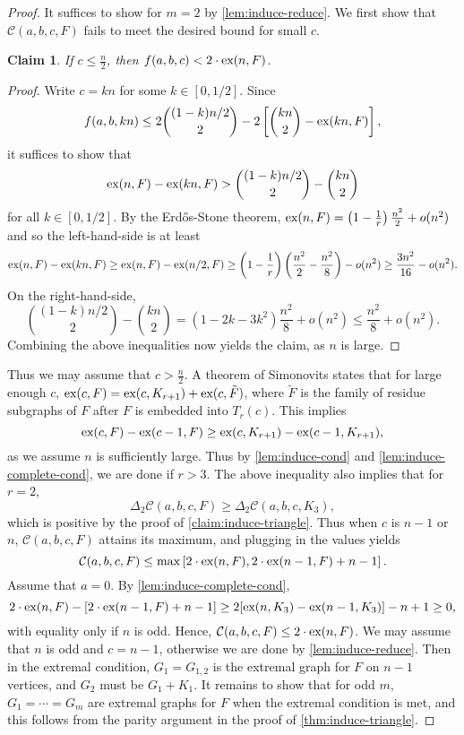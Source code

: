 \documentclass[12pt]{report}
\newtheorem{claim}{Claim}[theorem]
\newcommand*{\ex}{\textnormal{ex}}
\newcommand*{\con}{\mathcal{C}}
\begin{document}
\begin{proof}
  It suffices to show for $m = 2$ by \cref{lem:induce-reduce}. We first show that $\con(a, b, c, F)$ fails to meet the desired bound for small $c$.
  \begin{claim}
    If $c \leq \frac{n}{2}$, then $f(a, b, c) < 2 \cdot \ex(n, F)$.
  \end{claim}

  \begin{proof}
    Write $c = kn$ for some $k \in [0, 1/2]$. Since
    \[
      f(a, b, kn) \leq 2\binom{(1 - k)n/2}{2} - 2\left[\binom{kn}{2} - \ex(kn, F)\right],
    \]
    it suffices to show that
    \[
      \ex(n, F) - \ex(kn, F) > \binom{(1 - k)n/2}{2} - \binom{kn}{2}
    \]
    for all $k \in [0, 1/2]$. By the Erdős-Stone theorem, $\ex(n, F) = \left(1 - \frac{1}{r}\right)\frac{n^2}{2} + o(n^2)$ and so the left-hand-side is at least
    \[
      \ex(n, F) - \ex(kn, F) \geq \ex(n, F) - \ex(n/2, F) \geq \left(1 - \frac{1}{r}\right)\left(\frac{n^2}{2} - \frac{n^2}{8}\right) - o(n^2) \geq \frac{3n^2}{16} - o(n^2).
    \]
    On the right-hand-side, 
    \[
      \binom{(1 - k)n/2}{2} - \binom{kn}{2} = (1 - 2k - 3k^2)\frac{n^2}{8} + o(n^2) \leq \frac{n^2}{8} + o(n^2).
    \]
    Combining the above inequalities now yields the claim, as $n$ is large.
  \end{proof}

  Thus we may assume that $c > \frac{n}{2}$. A theorem of Simonovits states that for large enough $c$, $\ex(c, F) = \ex(c, K_{r + 1}) + \ex(c, \tilde{F})$, where $\tilde{F}$ is the family of residue subgraphs of $F$ after $F$ is embedded into $T_r(c)$. This implies
  \[
    \ex(c, F) - \ex(c - 1, F) \geq \ex(c, K_{r + 1}) - \ex(c - 1, K_{r + 1}),
  \]
  as we assume $n$ is sufficiently large. Thus by \cref{lem:induce-cond} and \cref{lem:induce-complete-cond}, we are done if $r > 3$. The above inequality also implies that for $r = 2$,
  \[
    \Delta_2 \con(a, b, c, F) \geq \Delta_2 \con(a, b, c, K_3),
  \]
  which is positive by the proof of \cref{claim:induce-triangle}. Thus when $c$ is $n - 1$ or $n$, $\con(a, b, c, F)$ attains its maximum, and plugging in the values yields 
  \[
    \con(a, b, c, F) \leq \max\left[2 \cdot \ex(n, F), 2 \cdot \ex(n - 1, F) + n - 1\right].
  \]
  Assume that $a = 0$. By \cref{lem:induce-complete-cond},
  \[
    2 \cdot \ex(n, F) - [2 \cdot \ex(n - 1, F) + n - 1] \geq 2[\ex(n, K_{3}) - \ex(n - 1, K_{3})] - n + 1 \geq 0,
  \]
  with equality only if $n$ is odd. Hence, $\con(a, b, c, F) \leq 2 \cdot \ex(n, F)$. We may assume that $n$ is odd and $c = n - 1$, otherwise we are done by \cref{lem:induce-reduce}. Then in the extremal condition, $G_1 = G_{1, 2}$ is the extremal graph for $F$ on $n - 1$ vertices, and $G_2$ must be $G_1 + K_1$. It remains to show that for odd $m$, $G_1 = \cdots = G_m$ are extremal graphs for $F$ when the extremal condition is met, and this follows from the parity argument in the proof of \cref{thm:induce-triangle}.
\end{proof}
\end{document}
